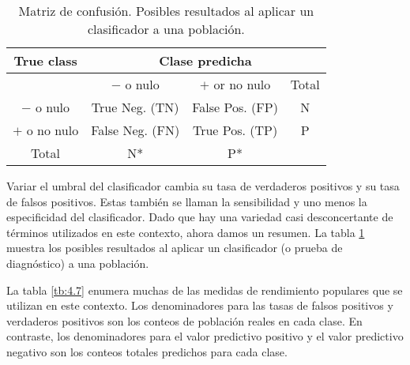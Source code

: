 \begin{table}[h]
\centering
\begin{tabular}{c|c|c|c}
\hline
True class & \multicolumn{3}{c}{Clase predicha} \\ \hline
& $-$ o nulo & $+$ or no nulo & Total \\ \hline
$-$ o nulo & True Neg. (TN) & False Pos. (FP) & N \\ \hline
$+$ o no nulo & False Neg. (FN) & True Pos. (TP) & P \\ \hline
Total & N* & P* &  \\ \hline
\end{tabular}
\caption{Matriz de confusión. Posibles resultados al aplicar un clasificador a una población.}
\label{tb:4.6}
\end{table}

Variar el umbral del clasificador cambia su tasa de verdaderos positivos y su tasa de falsos positivos. Estas también se llaman la sensibilidad y uno menos la especificidad del clasificador. Dado que hay una variedad casi desconcertante de términos utilizados en este contexto, ahora damos un resumen. La tabla \ref{tb:4.6} muestra los posibles resultados al aplicar un clasificador (o prueba de diagnóstico) a una población. \\

\begin{table}[h]
\centering
{}
\caption{Medidas de rendimiento para clasificación.}
\label{tb:4.7}
\end{table}

La tabla \ref{tb:4.7} enumera muchas de las medidas de rendimiento populares que se utilizan en este contexto. Los denominadores para las tasas de falsos positivos y verdaderos positivos son los conteos de población reales en cada clase. En contraste, los denominadores para el valor predictivo positivo y el valor predictivo negativo son los conteos totales predichos para cada clase.

